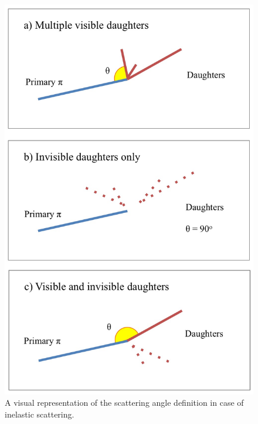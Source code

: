 \begin{figure}[ht]
\begin{minipage}[t]{0.45\linewidth}
\includegraphics[width=\textwidth]{Chapter-5/Images/Daughters.png}
\caption{A visual representation of the scattering angle definition in case of inelastic scattering.}
\label{fig:scatterPic}
\end{minipage}
\end{figure}



